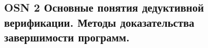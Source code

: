 \subsection{OSN 2 Основные понятия дедуктивной верификации. Методы доказательства
завершимости программ.}
